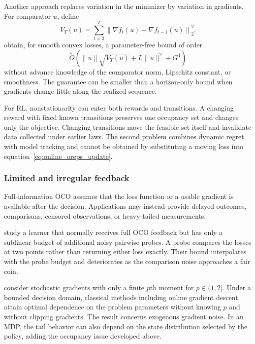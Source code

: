 Another approach replaces variation in the minimizer by variation in gradients. For comparator $u$, define
\begin{equation}
V_T(u)
=
\sum_{t=2}^T
\left\lVert
\nabla f_t(u)-\nabla f_{t-1}(u)
\right\rVert_2^2.
\label{eq:online_gradient_variation}
\end{equation}
\citet{zhao2026gradient} obtain, for smooth convex losses, a parameter-free bound of order
\begin{equation}
\widetilde O\!\left(
\lVert u\rVert\sqrt{V_T(u)}
+
L\lVert u\rVert^2
+
G^4
\right)
\label{eq:online_gradient_variation_bound}
\end{equation}
without advance knowledge of the comparator norm, Lipschitz constant, or smoothness. The guarantee can be smaller than a horizon-only bound when gradients change little along the realized sequence.

For RL, nonstationarity can enter both rewards and transitions. A changing reward with fixed known transitions preserves one occupancy set and changes only the objective. Changing transitions move the feasible set itself and invalidate data collected under earlier laws. The second problem combines dynamic regret with model tracking and cannot be obtained by substituting a moving loss into equation~\eqref{eq:online_oreps_update}.

\subsubsection{Limited and irregular feedback}

Full-information OCO assumes that the loss function or a usable gradient is available after the decision. Applications may instead provide delayed outcomes, comparisons, censored observations, or heavy-tailed measurements.

\citet{digregorio2026probes} study a learner that normally receives full OCO feedback but has only a sublinear budget of additional noisy pairwise probes. A probe compares the losses at two points rather than returning either loss exactly. Their bound interpolates with the probe budget and deteriorates as the comparison noise approaches a fair coin.

\citet{liu2026heavytails} consider stochastic gradients with only a finite $p$th moment for $p\in(1,2]$. Under a bounded decision domain, classical methods including online gradient descent attain optimal dependence on the problem parameters without knowing $p$ and without clipping gradients. The result concerns exogenous gradient noise. In an MDP, the tail behavior can also depend on the state distribution selected by the policy, adding the occupancy issue developed above.

